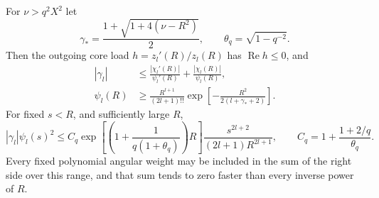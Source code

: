 \begin{lemma}\label{rg:barrier}
For $\nu>q^2X^2$ let
\[
 \gamma_*=\frac{1+\sqrt{1+4(\nu-R^2)}}2,\qquad
 \theta_q=\sqrt{1-q^{-2}}.
\]
Then the outgoing core load $h=z_l'(R)/z_l(R)$ has
$\operatorname{Re}h\leq0$, and
\begin{align}
 |\gamma_l|&\leq
   \frac{|\chi_l'(R)|}{\psi_l'(R)}
       +\frac{|\chi_l(R)|}{\psi_l(R)},\label{rg:loadbound}\\
 \psi_l(R)&\geq\frac{R^{l+1}}{(2l+1)!!}
       \exp\left[-\frac{R^2}{2(l+\gamma_*+2)}\right].
       \label{rg:psilower}
\end{align}
For fixed $s<R$, and sufficiently large $R$,
\begin{equation}\label{rg:hightail}
 |\gamma_l|\psi_l(s)^2
 \leq C_q\exp\left[\left(1+\frac1{q(1+\theta_q)}\right)R\right]
       \frac{s^{2l+2}}{(2l+1)R^{2l+1}},\qquad
 C_q=1+\frac{1+2/q}{\theta_q}.
\end{equation}
Every fixed polynomial angular weight may be included in the
sum of the right side over this range, and that sum tends to
zero faster than every inverse power of $R$.
\end{lemma}
